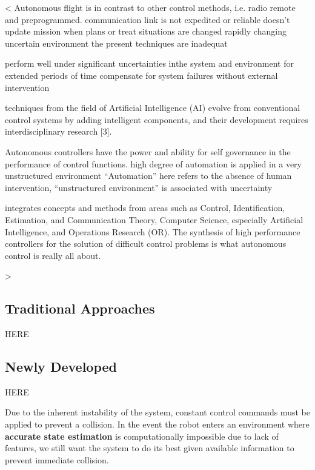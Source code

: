 <
Autonomous flight is in contrast to other
control methods, i.e. radio remote and preprogrammed.
    communication  link  is  not  expedited  or  reliable
    doesn’t  update  mission  when  plans  or  treat  situations  are  changed
    rapidly  changing  uncertain  environment the present techniques are inadequat

perform  well  under  significant  uncertainties  inthe  system  and  environment for extended periods of time
compensate  for  system  failures  without  external  intervention

techniques  from  the  field  of  Artificial  Intelligence  (AI)  
    evolve  from  conventional  control  systems  by  adding  intelligent  components,  and  their  development requires interdisciplinary research [3]. 

Autonomous  controllers  have  the  power  and  ability  for  self  governance  in  the  performance  of  control  functions.
high  degree   of   automation   is   applied   in   a   very   unstructured   environment
“Automation”  here  refers  to  the  absence  of  human   intervention,
“unstructured   environment”   is   associated with uncertainty

integrates concepts and methods from areas such as Control, Identification,   Estimation,   and   Communication   Theory,   Computer   Science,   especially   Artificial   Intelligence,   and   Operations  Research  (OR).  
The   synthesis   of   high   performance   controllers  for  the  solution  of  difficult  control  problems  is  what autonomous control is really all about.  

>

\subsection{Traditional Approaches}

HERE


\subsection{Newly Developed}
HERE


Due to the inherent instability of the system, constant control commands must be applied to
prevent a collision. In the event the robot enters an environment where \textbf{accurate state estimation}
is computationally impossible due to lack of features, we still want the system to do its best given
available information to prevent immediate collision.